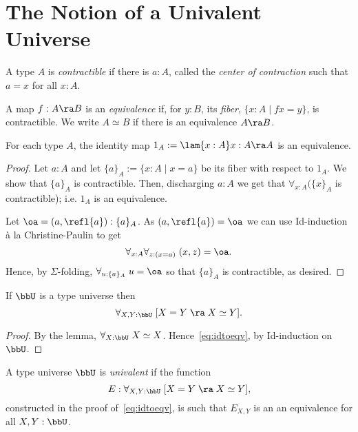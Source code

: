 \section{The Notion of a Univalent Universe}
\begin{defn} A type $A$ is {\em contractible} if there is $a:A$, called the {\em center of contraction} such that $a=x$ for all $x:A$.
\end{defn}
\begin{defn} A map $f:A\ra B$ is an {\em equivalence}
if, for $y:B$, its {\em fiber}, $\{x:A\mid fx = y\}$, is contractible.
We write $A\simeq B$ if  there is an equivalence $A\ra B$.
\end{defn}

\begin{lem}\label{lem:2.3}  For each type $A$, the identity map 
$1_A:= \lam{x:A}x :A\ra A$ is an equivalence.
\end{lem}
\begin{proof}  Let $a:A$ and let $\{ a\}_A:= \{ x:A\mid x=a\}$ be its fiber with respect to $1_A$.  We show that $\{ a\}_A$ is contractible.  Then, discharging $a:A$ we get that $\forall_{x:A}(\{ x\}_A$ is contractible); i.e. $1_A$ is an equivalence.

Let $\oa =(a,\refl{a}):\{ a\}_A$.  As $(a,\refl{a}) = \oa$ we can use Id-induction \`{a} la Christine-Paulin to get
  \[\forall_{x:A}\forall_{z:(x=a)}\; (x,z)=\oa.\]
Hence, by $\Sigma$-folding, $\forall_{u:\{ a\}_A}\; u=\oa$ so that $\{ a\}_A$ is contractible, as desired.
\end{proof}

\begin{cor}\label{ua:idtoeqv}
If $\bbU$ is a type universe then
\begin{equation}\label{eq:idtoeqv}
  \forall_{X,Y:\bbU}\; [X=Y\;\ra\; X\simeq Y].
\end{equation}
\end{cor}
\begin{proof}
By the lemma, $\forall_{X:\bbU}\; X\simeq X$.  Hence~\eqref{eq:idtoeqv}, by Id-induction on $\bbU$.
\end{proof}

\begin{defn}
A type universe $\bbU$ is {\em univalent} if the function
  \[ E:\forall_{X,Y:\bbU}\; [X=Y\;\ra\; X\simeq Y],\] 
constructed in the proof of~\eqref{eq:idtoeqv}, is such that $E_{X,Y}$ is an an equivalence for all $X,Y:\bbU$.
\end{defn}


